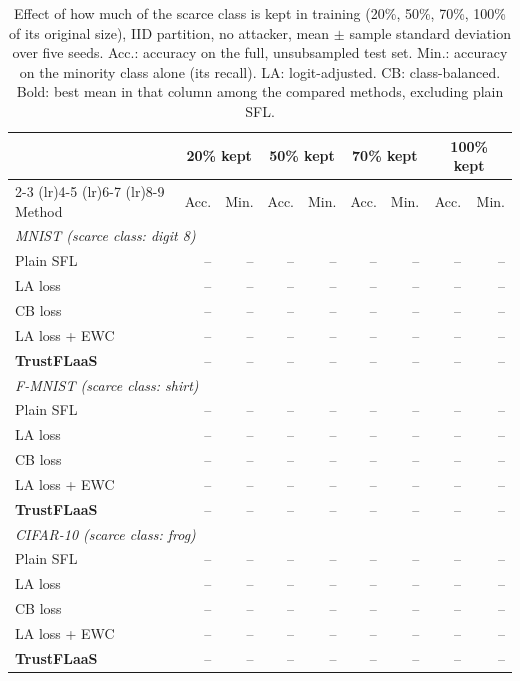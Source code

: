 \begin{table}[t]
\centering
\scriptsize
\setlength{\tabcolsep}{3pt}
\caption{Effect of how much of the scarce class is kept in training (20\%, 50\%, 70\%, 100\% of its original size), IID partition, no attacker, mean $\pm$ sample standard deviation over five seeds. Acc.: accuracy on the full, unsubsampled test set. Min.: accuracy on the minority class alone (its recall). LA: logit-adjusted. CB: class-balanced. Bold: best mean in that column among the compared methods, excluding plain SFL.}
\label{tab:keepfrac}
\begin{tabular}{lrrrrrrrr}
\toprule
 & \multicolumn{2}{c}{20\% kept} & \multicolumn{2}{c}{50\% kept} & \multicolumn{2}{c}{70\% kept} & \multicolumn{2}{c}{100\% kept} \\
\cmidrule(lr){2-3} \cmidrule(lr){4-5} \cmidrule(lr){6-7} \cmidrule(lr){8-9}
Method & Acc. & Min. & Acc. & Min. & Acc. & Min. & Acc. & Min. \\
\midrule
\multicolumn{9}{l}{\textit{MNIST (scarce class: digit 8)}} \\
Plain SFL & -- & -- & -- & -- & -- & -- & -- & -- \\
LA loss & -- & -- & -- & -- & -- & -- & -- & -- \\
CB loss & -- & -- & -- & -- & -- & -- & -- & -- \\
LA loss + EWC & -- & -- & -- & -- & -- & -- & -- & -- \\
\textbf{TrustFLaaS} & -- & -- & -- & -- & -- & -- & -- & -- \\
\midrule
\multicolumn{9}{l}{\textit{F-MNIST (scarce class: shirt)}} \\
Plain SFL & -- & -- & -- & -- & -- & -- & -- & -- \\
LA loss & -- & -- & -- & -- & -- & -- & -- & -- \\
CB loss & -- & -- & -- & -- & -- & -- & -- & -- \\
LA loss + EWC & -- & -- & -- & -- & -- & -- & -- & -- \\
\textbf{TrustFLaaS} & -- & -- & -- & -- & -- & -- & -- & -- \\
\midrule
\multicolumn{9}{l}{\textit{CIFAR-10 (scarce class: frog)}} \\
Plain SFL & -- & -- & -- & -- & -- & -- & -- & -- \\
LA loss & -- & -- & -- & -- & -- & -- & -- & -- \\
CB loss & -- & -- & -- & -- & -- & -- & -- & -- \\
LA loss + EWC & -- & -- & -- & -- & -- & -- & -- & -- \\
\textbf{TrustFLaaS} & -- & -- & -- & -- & -- & -- & -- & -- \\
\bottomrule
\end{tabular}
\end{table}
